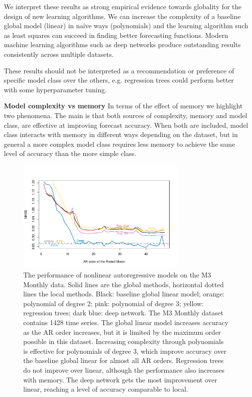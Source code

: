 \documentclass[a4paper]{article}
\theoremstyle{custom}
\begin{document}
We interpret these results as strong empirical evidence towards globality for the design of new learning algorithms. We can increase the complexity of a baseline global model (linear) in naïve ways (polynomials) and the learning algorithm such as least squares can succeed in finding better forecasting functions. Modern machine learning algorithms such as deep networks produce outstanding results consistently across multiple datasets.

These results should not be interpreted as a recommendation or preference of specific model class over the others, e.g. regression trees could perform better with some hyperparameter tuning.

\par{\textbf{Model complexity vs memory}}
In terms of the effect of memory we highlight two phenomena.
The main is that both sources of complexity, memory and model class, are effective at improving forecast accuracy. When both are included, model class interacts with memory in different ways depending on the dataset, but in general a more complex model class requires less memory to achieve the same level of accuracy than the more simple class.

\begin{figure}[!htb]
  \centering
  \includegraphics[width=0.75\textwidth]{fig/MCompandTour/M3MonthNonlin.pdf}
  \caption{The performance of nonlinear autoregressive models on the M3 Monthly data. Solid lines are the global methods, horizontal dotted lines the local methods. Black:  baseline global linear model; orange: polynomial of degree 2; pink: polynomial of degree 3; yellow: regression trees; dark blue: deep network. The M3 Monthly dataset contains 1428 time series. The global linear model increases accuracy as the AR order increases, but it is limited by the maximum order possible in this dataset. Increasing complexity through polynomials is effective for polynomials of degree 3, which improve accuracy over the baseline global linear for almost all AR orders. Regression trees do not improve over linear, although the performance also increases with memory. The deep network gets the most improvement over linear, reaching a level of accuracy comparable to local.}
  \label{fig:nonlinear}
\end{figure}
\end{document}
